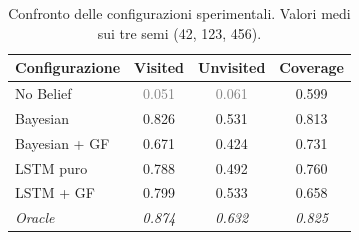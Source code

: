 \begin{table}[ht]
\centering
\caption{Confronto delle configurazioni sperimentali. Valori medi sui tre semi (42, 123, 456).}
\label{tab:results_summary}
\begin{tabular}{lccc}
\toprule
\textbf{Configurazione} & \textbf{Visited} & \textbf{Unvisited} & \textbf{Coverage} \\
\midrule
No Belief & \textcolor{gray}{0.051} & \textcolor{gray}{0.061} & 0.599 \\
Bayesian & 0.826 & 0.531 & 0.813 \\
Bayesian + GF & 0.671 & 0.424 & 0.731 \\
LSTM puro & 0.788 & 0.492 & 0.760 \\
LSTM + GF & 0.799 & 0.533 & 0.658 \\
\midrule
\textit{Oracle} & \textit{0.874} & \textit{0.632} & \textit{0.825} \\
\bottomrule
\end{tabular}
\end{table}